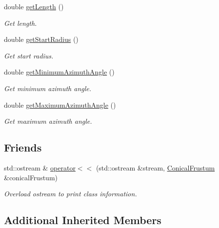 \begin{DoxyCompactItemize}
double \hyperlink{classtudat_1_1geometric__shapes_1_1ConicalFrustum_a3259f0efc48cd09ae54529567aecf0b0}{get\+Length} ()
\begin{DoxyCompactList}\small\item\em Get length. \end{DoxyCompactList}\item 
double \hyperlink{classtudat_1_1geometric__shapes_1_1ConicalFrustum_af16e6112014590109a2d13453b91a3fd}{get\+Start\+Radius} ()
\begin{DoxyCompactList}\small\item\em Get start radius. \end{DoxyCompactList}\item 
double \hyperlink{classtudat_1_1geometric__shapes_1_1ConicalFrustum_a48d15477e1ca6717ed93d37267654704}{get\+Minimum\+Azimuth\+Angle} ()
\begin{DoxyCompactList}\small\item\em Get minimum azimuth angle. \end{DoxyCompactList}\item 
double \hyperlink{classtudat_1_1geometric__shapes_1_1ConicalFrustum_a880c2cbd3a8cbbdb34c34ac3d8af5181}{get\+Maximum\+Azimuth\+Angle} ()
\begin{DoxyCompactList}\small\item\em Get maximum azimuth angle. \end{DoxyCompactList}\end{DoxyCompactItemize}
\subsection*{Friends}
\begin{DoxyCompactItemize}
\item 
std\+::ostream \& \hyperlink{classtudat_1_1geometric__shapes_1_1ConicalFrustum_a0ddab88d9e9edb5a28d756d80c994957}{operator$<$$<$} (std\+::ostream \&stream, \hyperlink{classtudat_1_1geometric__shapes_1_1ConicalFrustum}{Conical\+Frustum} \&conical\+Frustum)
\begin{DoxyCompactList}\small\item\em Overload ostream to print class information. \end{DoxyCompactList}\end{DoxyCompactItemize}
\subsection*{Additional Inherited Members}


